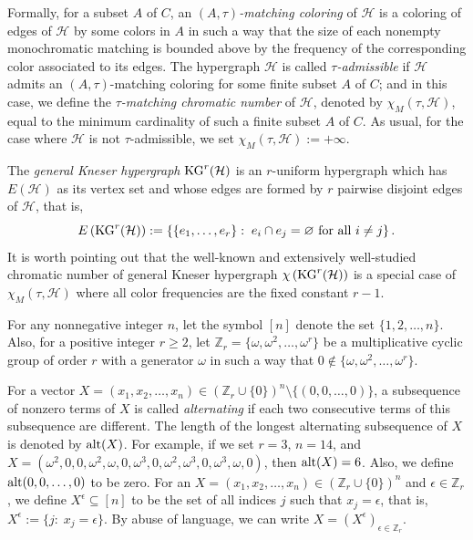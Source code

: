 \documentclass[11pt]{amsart}
\theoremstyle{definition}
\begin{document}
\noindent Formally, for a subset $A$ of $C$, an {\it $(A,\tau)$-matching coloring} of ${\mathcal H}$ is
a coloring of edges of ${\mathcal H}$ by some colors in $A$ in such a way that the size of each nonempty monochromatic matching is bounded above by the frequency of the corresponding color associated to its edges.
The hypergraph ${\mathcal H}$ is called {\it $\tau$-admissible} if ${\mathcal H}$ admits an $(A,\tau)$-matching coloring for some finite subset $A$ of $C$; and in this case, we define the {\it $\tau$-matching chromatic number} of ${\mathcal H}$, denoted by $\chi_M(\tau, {\mathcal H})$, equal to the minimum cardinality of such a finite subset $A$ of $C$. As usual, for the case where ${\mathcal H}$ is not $\tau$-admissible, we set $\chi_M(\tau, {\mathcal H}):=+\infty$.

The {\it general Kneser hypergraph} ${\rm KG}^r({\mathcal H})$ is an $r$-uniform hypergraph which has $E({\mathcal H})$ as its vertex set and  whose edges are formed by $r$ pairwise disjoint edges of ${\mathcal H}$, that is,
$$E\left({\rm KG}^r({\mathcal H})\right) :=\left\{\{e_1,\ldots,e_r\}:\; e_i\cap e_j=\varnothing \mbox{ for all } i\neq j\right\}.$$
It is worth pointing out that the well-known and extensively well-studied chromatic number of general Kneser hypergraph $\chi \left( {\rm KG}^r({\mathcal H}) \right)$ is a special case of $\chi_M(\tau, {\mathcal H})$ where all color frequencies are the fixed constant $r-1$.

For any nonnegative integer $n$, let the symbol $[n]$ denote the set $\{1, 2, \dots , n\}$.
Also, for a positive integer $r\geq 2$,
let $\mathbb{Z}_r=\{\omega,\omega^2,\ldots,\omega^r\}$ be a multiplicative cyclic group of order $r$  with a generator $\omega$ in such a way that
$0 \notin \{\omega,\omega^2,\ldots,\omega^r\}$.

\noindent For a vector $X=(x_1,x_2,\ldots,x_n)\in(\mathbb{Z}_r\cup\{0\})^n\setminus\{(0,0, \dots , 0)\}$, a subsequence of nonzero terms of $X$ is called {\it alternating} if each two consecutive terms of this subsequence are different.  The length of the longest alternating subsequence of $X$ is denoted by ${\rm alt}(X)$. For example,
if we set $r=3$, $n=14$, and $X=(\omega^2 , 0 , 0 , \omega^2,\omega , 0 ,\omega^3 , 0 , \omega^2 , \omega^3 , 0 , \omega^3 , \omega , 0)$, then ${\rm alt}(X)=6$.
Also, we define ${\rm alt}(0,0,\dots,0)$ to be zero.
For an $X=(x_1,x_2,\ldots,x_n)\in(\mathbb{Z}_r\cup\{0\})^n$ and $\epsilon\in \mathbb{Z}_r$, we define $X^\epsilon\subseteq [n]$ to be the set of all indices $j$ such that $x_j=\epsilon$, that is,
$X^\epsilon :=\{j:\; x_j=\epsilon\}$.
By abuse of language, we can write $X=\displaystyle{\left(X^\epsilon\right)}_{\epsilon\in\mathbb{Z}_r}$.
\end{document}
